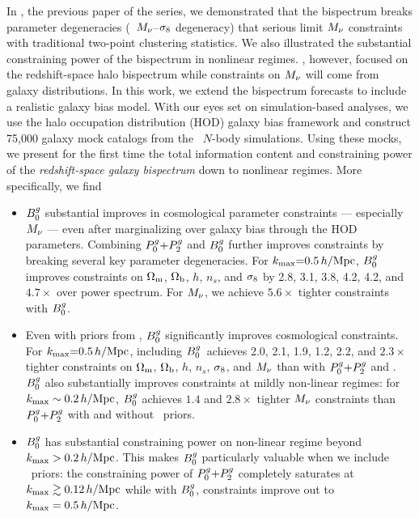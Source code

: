 In \cite{hahn2020}, the previous paper of the series, we demonstrated that the 
bispectrum breaks parameter degeneracies (\eg~$M_\nu$--$\sigma_8$ degeneracy) that 
serious limit $M_\nu$ constraints with traditional two-point clustering statistics. 
We also illustrated the substantial constraining power of the bispectrum in nonlinear regimes.
\cite{hahn2020}, however, focused on the redshift-space halo bispectrum while 
constraints on $M_\nu$ will come from galaxy distributions. %
In this work, we extend the \cite{hahn2020} bispectrum forecasts to
include a realistic galaxy bias model. With our eyes set on
simulation-based analyses, we use the halo occupation distribution (HOD) galaxy
bias framework and construct 75,000 galaxy mock catalogs from the \quij~$N$-body 
simulations. Using these mocks, we present for the first time the total information
content and constraining power of the {\em redshift-space galaxy bispectrum} 
down to nonlinear regimes. More specifically, we find
\begin{itemize}
    \item $B^g_0$ substantial improves in cosmological parameter constraints ---
        especially $M_\nu$ --- even after marginalizing over galaxy bias through
        the HOD parameters. Combining $P^g_0{+}P^g_2$ and $B^g_0$ further improves
        constraints by breaking several key parameter degeneracies. For 
        $k_{\rm max}{=}0.5\,h/\mathrm{Mpc}$, $B^g_0$ improves constraints on 
        $\Omega_{\rm m}$, $\Omega_{\rm b}$, $h$, $n_s$, and $\sigma_8$ by 2.8, 3.1, 3.8, 4.2, 4.2, and 
        $4.7{\times}$ over power spectrum. For $M_\nu$, we achieve $5.6\times$ 
        tighter constraints with $B^g_0$.

    \item Even with priors from \planck, $B^g_0$ significantly improves
        cosmological constraints. For $k_{\rm max}{=}0.5\,h/\mathrm{Mpc}$, including 
        $B^g_0$~achieves 2.0, 2.1, 1.9, 1.2, 2.2, and $2.3\times$ tighter
        constraints on $\Omega_{\rm m}$, $\Omega_{\rm b}$, $h$, $n_s$, $\sigma_8$, and $M_\nu$ than with $P^g_0{+}P^g_2$
        and \planck. $B^g_0$ also
        substantially improves constraints at mildly non-linear regimes:
        for $k_{\rm max}\sim0.2\,h/\mathrm{Mpc}$, $B^g_0$ achieves $1.4$ and $2.8\times$ tighter
        $M_\nu$ constraints than $P^g_0{+}P^g_2$ with and without \planck~priors. 

    \item $B^g_0$ has substantial constraining power on non-linear regime beyond
        $k_{\rm max} > 0.2\,h/\mathrm{Mpc}$. This makes $B^g_0$ particularly valuable when we include
        \planck~priors: the constraining power of $P^g_0{+}P^g_2$ completely saturates 
        at $k_{\rm max} \gtrsim 0.12\,h/\mathrm{Mpc}$ while with $B^g_0$, constraints improve out to 
        $k_{\rm max}=0.5\,h/\mathrm{Mpc}$. 
\end{itemize}


